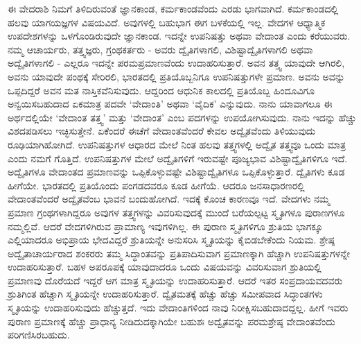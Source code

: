 ಈ ವೇದರಾಶಿ ನಿಮಗೆ ತಿಳಿದಿರುವಂತೆ ಜ್ಞಾನಕಾಂಡ, ಕರ್ಮಕಾಂಡವೆಂದು ಎರಡು ಭಾಗವಾಗಿದೆ. ಕರ್ಮಕಾಂಡದಲ್ಲಿ ಹಲವು ಯಾಗಯಜ್ಞಗಳ ವಿಷಯವಿದೆ. ಅವುಗಳಲ್ಲಿ ಬಹುಭಾಗ ಈಗ ಬಳಕೆಯಲ್ಲಿ ಇಲ್ಲ. ವೇದಗಳ ಆಧ್ಯಾತ್ಮಿಕ ಉಪದೇಶಗಳನ್ನು ಒಳಗೊಂಡಿರುವುದೇ ಜ್ಞಾನಕಾಂಡ. ಇದನ್ನೇ ಉಪನಿಷತ್ತು ಅಥವಾ ವೇದಾಂತ ಎಂದು ಕರೆಯುವರು. ನಮ್ಮ ಆಚಾರ್ಯರು, ತತ್ತ್ವಜ್ಞರು, ಗ್ರಂಥಕರ್ತರು - ಅವರು ದ್ವೈತಿಗಳಾಗಲಿ, ವಿಶಿಷ್ಟಾದ್ವೈತಿಗಳಾಗಲಿ ಅಥವಾ ಅದ್ವೈತಿಗಳಾಗಲಿ - ಎಲ್ಲರೂ ಇದನ್ನೇ ಪರಮಪ್ರಮಾಣವೆಂದು ಉದಾಹರಿಸುತ್ತಾರೆ. ಅವನ ತತ್ತ್ವ ಯಾವುದೇ ಆಗಿರಲಿ, ಅವನು ಯಾವುದೇ ಪಂಥಕ್ಕೆ ಸೇರಿರಲಿ, ಭಾರತದಲ್ಲಿ ಪ್ರತಿಯೊಬ್ಬನಿಗೂ ಉಪನಿಷತ್ತುಗಳೇ ಪ್ರಮಾಣ. ಅವನು ಅವನ್ನು ಒಪ್ಪದಿದ್ದರೆ ಅವನ ಮತ ನಾಸ್ತಿಕವೆನಿಸುವುದು. ಆದ್ದರಿಂದ ಆಧುನಿಕ ಕಾಲದಲ್ಲಿ ಪ್ರತಿಯೊಬ್ಬ ಹಿಂದೂವಿಗೂ ಅನ್ವಯಿಸಬಹುದಾದ ಏಕಮಾತ್ರ ಪದವೇ ‘ವೇದಾಂತಿ’ ಅಥವಾ ‘ವೈದಿಕ’ ಎನ್ನುವುದು. ನಾನು ಯಾವಾಗಲೂ ಈ ಅರ್ಥದಲ್ಲಿಯೇ ‘ವೇದಾಂತ ತತ್ತ್ವ’ ಮತ್ತು ‘ವೇದಾಂತ’ ಎಂಬ ಪದಗಳನ್ನು ಉಪಯೋಗಿಸುವುದು. ನಾನು ಇದನ್ನು ಹೆಚ್ಚು ವಿಶದಪಡಿಸಲು ಇಚ್ಛಿಸುತ್ತೇನೆ. ಏಕೆಂದರೆ ಈಚೆಗೆ ವೇದಾಂತವೆಂದರೆ ಕೇವಲ ಅದ್ವೈತವೆಂದು ತಿಳಿಯುವುದು ರೂಢಿಯಾಗಿಹೋಗಿದೆ. ಉಪನಿಷತ್ತುಗಳ ಆಧಾರದ ಮೇಲೆ ನಿಂತ ಹಲವು ತತ್ತ್ವಗಳಲ್ಲಿ ಅದ್ವೈತ ತತ್ತ್ವವೂ ಒಂದು ಮಾತ್ರ ಎಂದು ನಮಗೆ ಗೊತ್ತಿದೆ. ಉಪನಿಷತ್ತುಗಳ ಮೇಲೆ ಅದ್ವೈತಿಗಳಿಗೆ ಇರುವಷ್ಟೇ ಪೂಜ್ಯಭಾವ ವಿಶಿಷ್ಟಾದ್ವೈತಿಗಳಿಗೂ ಇದೆ. ಅದ್ವೈತಿಗಳೂ ವೇದಾಂತದ ಪ್ರಮಾಣವನ್ನು ಒಪ್ಪಿಕೊಳ್ಳುವಷ್ಟೇ ವಿಶಿಷ್ಟಾದ್ವೈತಿಗಳೂ ಒಪ್ಪಿಕೊಳ್ಳುತ್ತಾರೆ. ದ್ವೈತಿಗಳು ಕೂಡ ಹೀಗೆಯೇ. ಭಾರತದಲ್ಲಿ ಪ್ರತಿಯೊಂದು ಪಂಗಡದವರೂ ಕೂಡ ಹೀಗೆಯೆ. ಆದರೂ ಜನಸಾಧಾರಣರಲ್ಲಿ ವೇದಾಂತವೆಂದರೆ ಅದ್ವೈತವೆಂಬ ಭಾವನೆ ಬಂದುಹೋಗಿದೆ. ಇದಕ್ಕೆ ಕೊಂಚ ಕಾರಣವೂ ಇದೆ. ವೇದಗಳು ನಮ್ಮ ಪ್ರಮಾಣ ಗ್ರಂಥಗಳಾಗಿದ್ದರೂ ಅವುಗಳ ತತ್ತ್ವಗಳನ್ನು ವಿವರಿಸುವುದಕ್ಕೆ ಮುಂದೆ ಬರೆಯಲ್ಪಟ್ಟ ಸ್ಮೃತಿಗಳೂ ಪುರಾಣಗಳೂ ನಮ್ಮಲ್ಲಿವೆ. ಆದರೆ ವೇದಗಳಿಗಿರುವ ಪ್ರಾಮಾಣ್ಯ ಇವುಗಳಿಗಿಲ್ಲ. ಈ ಪುರಾಣ ಸ್ಮೃತಿಗಳಿಗೂ ಶ್ರುತಿಯ ಭಾಗಕ್ಕೂ ಎಲ್ಲಿಯಾದರೂ ಅಭಿಪ್ರಾಯ ಭೇದವಿದ್ದರೆ ಶ್ರುತಿಯನ್ನೇ ಅನುಸರಿಸಿ ಸ್ಮೃತಿಯನ್ನು ಕೈಬಿಡಬೇಕೆಂದು ನಿಯಮ. ಶ್ರೇಷ್ಠ ಅದ್ವೈತಾಚಾರ್ಯರಾದ ಶಂಕರರು ತಮ್ಮ ಸಿದ್ಧಾಂತವನ್ನು ಪ್ರತಿಪಾದಿಸುವಾಗ ಪ್ರಮಾಣಕ್ಕಾಗಿ ಹೆಚ್ಚಾಗಿ ಉಪನಿಷತ್ತು\-ಗಳನ್ನೇ ಉದಾಹರಿಸುತ್ತಾರೆ. ಬಹಳ ಅಪರೂಪಕ್ಕೆ ಯಾವುದಾದರೂ ಒಂದು ವಿಷಯವನ್ನು ವಿವರಿಸುವಾಗ ಶ್ರುತಿಯಲ್ಲಿ ಪ್ರಮಾಣವು ದೊರೆಯದೆ ಇದ್ದರೆ ಆಗ ಮಾತ್ರ ಸ್ಮೃತಿಯನ್ನು ಉದಾಹರಿಸುತ್ತಾರೆ. ಆದರೆ ಇತರ ಸಂಪ್ರದಾಯವದವರು ಶ್ರುತಿಗಿಂತ ಹೆಚ್ಚಾಗಿ ಸ್ಮೃತಿಯನ್ನೇ ಉದಾಹರಿಸುತ್ತಾರೆ. ದ್ವೈತಮತಕ್ಕೆ ಹೆಚ್ಚು ಹೆಚ್ಚು ಸಮೀಪವಾದ ಸಿದ್ಧಾಂತಗಳು ಸ್ಮೃತಿಯನ್ನು ಉದಾಹರಿಸುವುದು ಹೆಚ್ಚುತ್ತದೆ. ಇದು ವೇದಾಂತಿಗಳಿಂದ ನಾವು ನಿರೀಕ್ಷಿಸಬಹುದಾದದ್ದಲ್ಲ. ಹೀಗೆ ಇವರು ಪುರಾಣ ಪ್ರಮಾಣಕ್ಕೆ ಹೆಚ್ಚು ಪ್ರಾಧಾನ್ಯ ನೀಡಿದುದಕ್ಕಾಗಿಯೇ ಬಹುಶಃ ಅದ್ವೈತವನ್ನು ಪರಮಶ್ರೇಷ್ಠ ವೇದಾಂತವೆಂದು ಪರಿಗಣಿಸಿರಬಹುದು.

